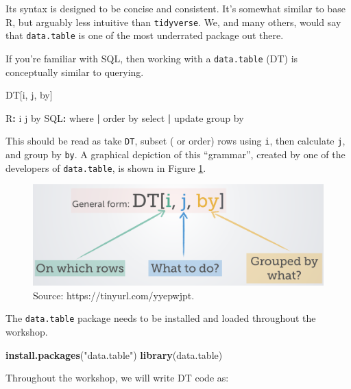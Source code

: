 \documentclass[]{book}
\newenvironment{Shaded}{\begin{snugshade}}{\end{snugshade}}
\newcommand{\KeywordTok}[1]{\textcolor[rgb]{0.13,0.29,0.53}{\textbf{#1}}}
\newcommand{\NormalTok}[1]{#1}
\newcommand{\OperatorTok}[1]{\textcolor[rgb]{0.81,0.36,0.00}{\textbf{#1}}}
\newcommand{\StringTok}[1]{\textcolor[rgb]{0.31,0.60,0.02}{#1}}
\begin{document}
Its syntax is designed to be concise and consistent. It's somewhat similar to base R, but arguably less intuitive than \texttt{tidyverse}. We, and many others, would say that \texttt{data.table} is one of the most underrated package out there.

If you're familiar with SQL, then working with a \texttt{data.table} (DT) is conceptually similar to querying.

\begin{Shaded}
\begin{Highlighting}[]
\NormalTok{DT[i, j, by]}

\NormalTok{  R}\OperatorTok{:}\StringTok{                 }\NormalTok{i                 j        by}
\NormalTok{SQL}\OperatorTok{:}\StringTok{  }\NormalTok{where }\OperatorTok{|}\StringTok{ }\NormalTok{order by   select }\OperatorTok{|}\StringTok{ }\NormalTok{update  group by}
\end{Highlighting}
\end{Shaded}

This should be read as take \texttt{DT}, subset ( or order) rows using \texttt{i}, then calculate \texttt{j}, and group by \texttt{by}. A graphical depiction of this ``grammar'', created by one of the developers of \texttt{data.table}, is shown in Figure \ref{fig:dtvis}.

\begin{figure}
\includegraphics[width=0.8\linewidth]{images/dtvis} \caption{Source: https://tinyurl.com/yyepwjpt.}\label{fig:dtvis}
\end{figure}

The \texttt{data.table} package needs to be installed and loaded throughout the workshop.

\begin{Shaded}
\begin{Highlighting}[]
\KeywordTok{install.packages}\NormalTok{(}\StringTok{"data.table"}\NormalTok{)}
\KeywordTok{library}\NormalTok{(data.table)}
\end{Highlighting}
\end{Shaded}

Throughout the workshop, we will write DT code as:
\end{document}
